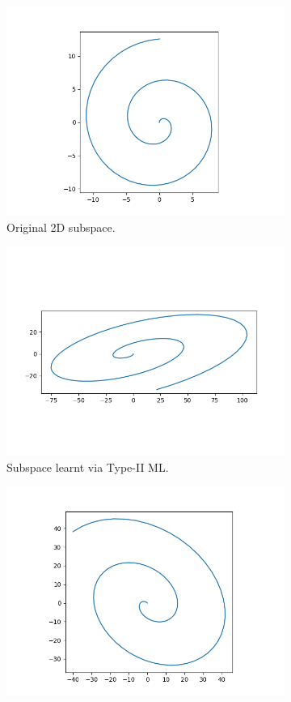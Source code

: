 \documentclass[10pt, a4paper, twocolumn]{article} %
\begin{document}
\begin{figure}[!htb]
\centering
\begin{subfigure}{.5\linewidth}
  \centering
  \includegraphics[width=.9\linewidth]{q21_a.png}
  \caption{Original 2D subspace.}
  \label{fig:q21a}
\end{subfigure}%
\begin{subfigure}{.5\linewidth}
  \centering
  \includegraphics[width=.9\linewidth]{q21_b.png}
  \caption{Subspace learnt via Type-II ML.}
  \label{fig:q21b}
\end{subfigure}
\begin{subfigure}{.5\linewidth}
  \centering
  \includegraphics[width=.9\linewidth]{q22.png}

\end{subfigure}
\end{figure}
\end{document}
